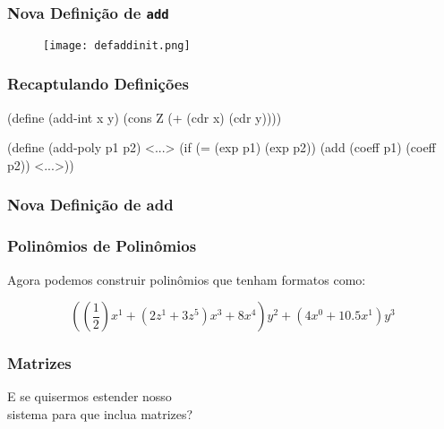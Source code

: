 \begin{frame}
  \frametitle{Nova Definição de \texttt{add}}
  \begin{figure}
    \centering
    \texttt{[image: defaddinit.png]}
  \end{figure}
\end{frame}


\begin{frame}[fragile]
  \frametitle{Recaptulando Definições}
  \begin{code}
(define (add-int x y)
  (cons Z (+ (cdr x)
             (cdr y))))
  \end{code}
  \pause
  \vspace{1em}

  \begin{code}
(define (add-poly p1 p2)
  <...>
  (if (= (exp p1) (exp p2))
      (add (coeff p1) (coeff p2))
      <...>))
  \end{code}
\end{frame}



\begin{frame}
  \frametitle{Nova Definição de add}
\end{frame}



\begin{frame}
  \frametitle{Polinômios de Polinômios}

  Agora podemos construir polinômios que tenham formatos como:

  \vspace{2em}

  \[(\left(\dfrac{1}{2}\right)x^1 + (2z^1 + 3z^5)x^3 + 8x^4)y^2 + (4x^0 + 10.5x^1)y^3\]
\end{frame}


\begin{frame}
  \frametitle{Matrizes}
  \begin{center}
    E se quisermos estender nosso \\
    sistema para que inclua matrizes?
  \end{center}
\end{frame}

